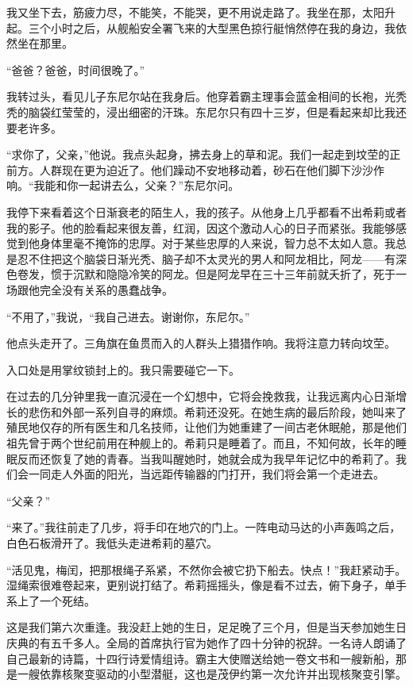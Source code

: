 \documentclass[AutoFakeBold=true]{book}
\begin{document}
我又坐下去，筋疲力尽，不能笑，不能哭，更不用说走路了。我坐在那，太阳升起。三个小时之后，从舰船安全署飞来的大型黑色掠行艇悄然停在我的身边，我依然坐在那里。

\vspace*{1em}

``爸爸？爸爸，时间很晚了。''

我转过头，看见儿子东尼尔站在我身后。他穿着霸主理事会蓝金相间的长袍，光秃秃的脑袋红莹莹的，浸出细密的汗珠。东尼尔只有四十三岁，但是看起来却比我还要老许多。

``求你了，父亲，''他说。我点头起身，拂去身上的草和泥。我们一起走到坟茔的正前方。人群现在更为迫近了。他们躁动不安地移动着，砂石在他们脚下沙沙作响。``我能和你一起讲去么，父亲？''东尼尔问。

我停下来看着这个日渐衰老的陌生人，我的孩子。从他身上几乎都看不出希莉或者我的影子。他的脸看起来很友善，红润，因这个激动人心的日子而紧张。我能够感觉到他身体里毫不掩饰的忠厚。对于某些忠厚的人来说，智力总不太如人意。我总是忍不住把这个脑袋日渐光秃、脑子却不太灵光的男人和阿龙相比，阿龙——有深色卷发，惯于沉默和隐隐冷笑的阿龙。但是阿龙早在三十三年前就夭折了，死于一场跟他完全没有关系的愚蠢战争。

``不用了，''我说，``我自己进去。谢谢你，东尼尔。''

他点头走开了。三角旗在鱼贯而入的人群头上猎猎作响。我将注意力转向坟茔。

入口处是用掌纹锁封上的。我只需要碰它一下。

在过去的几分钟里我一直沉浸在一个幻想中，它将会挽救我，让我远离内心日渐增长的悲伤和外部一系列自寻的麻烦。希莉还没死。在她生病的最后阶段，她叫来了殖民地仅存的所有医生和几名技师，让他们为她重建了一间古老休眠舱，那是他们祖先曾于两个世纪前用在种舰上的。希莉只是睡着了。而且，不知何故，长年的睡眠反而还恢复了她的青春。当我叫醒她时，她就会成为我早年记忆中的希莉了。我们会一同走人外面的阳光，当远距传输器的门打开，我们将会第一个走进去。

``父亲？''

``来了。''我往前走了几步，将手印在地穴的门上。一阵电动马达的小声轰鸣之后，白色石板滑开了。我低头走进希莉的墓穴。

\vspace*{1em}

``活见鬼，梅闰，把那根绳子系紧，不然你会被它扔下船去。快点！''我赶紧动手。湿绳索很难卷起来，更别说打结了。希莉摇摇头，像是看不过去，俯下身子，单手系上了一个死结。

这是我们第六次重逢。我没赶上她的生日，足足晚了三个月，但是当天参加她生日庆典的有五千多人。全局的首席执行官为她作了四十分钟的祝辞。一名诗人朗诵了自己最新的诗篇，十四行诗爱情组诗。霸主大使赠送给她一卷文书和一艘新船，那是一艘依靠核聚变驱动的小型潜艇，这也是茂伊约第一次允许并出现核聚变引擎。
\end{document}
